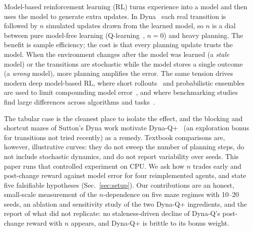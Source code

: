 Model-based reinforcement learning (RL) turns experience into a model and then uses the model to generate extra updates. In Dyna~\cite{sutton1991dyna} each real transition is followed by $n$ simulated updates drawn from the learned model, so $n$ is a dial between pure model-free learning (Q-learning~\cite{watkins1992q}, $n=0$) and heavy planning. The benefit is sample efficiency; the cost is that every planning update trusts the model. When the environment changes after the model was learned (a \emph{stale} model) or the transitions are stochastic while the model stores a single outcome (a \emph{wrong} model), more planning amplifies the error. The same tension drives modern deep model-based RL, where short rollouts~\cite{janner2019when} and probabilistic ensembles~\cite{chua2018deep} are used to limit compounding model error~\cite{moerland2020model}, and where benchmarking studies find large differences across algorithms and tasks~\cite{wang2019benchmarking}.

The tabular case is the cleanest place to isolate the effect, and the blocking and shortcut mazes of Sutton's Dyna work motivate Dyna-Q+~\cite{sutton1990integrated} (an exploration bonus for transitions not tried recently) as a remedy. Textbook comparisons are, however, illustrative curves: they do not sweep the number of planning steps, do not include stochastic dynamics, and do not report variability over seeds. This paper runs that controlled experiment on CPU. We ask how $n$ trades early and post-change reward against model error for four reimplemented agents, and state five falsifiable hypotheses (Sec.~\ref{sec:setup}). Our contributions are an honest, small-scale measurement of the $n$-dependence on five maze regimes with 10--20 seeds, an ablation and sensitivity study of the two Dyna-Q+ ingredients, and the report of what did not replicate: no staleness-driven decline of Dyna-Q's post-change reward with $n$ appears, and Dyna-Q+ is brittle to its bonus weight.
